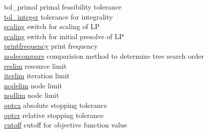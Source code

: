 \begin{tabbing}
{tol\_primal} \> primal feasibility tolerance \\
\hyperlink{tol_integer}
{tol\_integer} \> tolerance for integrality \\
\hyperlink{scaling}
{scaling} \> switch for scaling of LP \\
\hyperlink{presolve}
{scaling} \> switch for initial presolve of LP \\
\hyperlink{printfrequency}
{printfrequency} \> print frequency \\
\hyperlink{nodecompare}
{nodecompare} \> comparision method to determine tree search order \\
\hyperlink{reslim}
{reslim} \> resource limit \\
\hyperlink{iterlim}
{iterlim} \> iteration limit \\
\hyperlink{nodelim}
{nodelim} \> node limit \\
\hyperlink{nodlim}
{nodlim} \> node limit \\
\hyperlink{optca}
{optca} \> absolute stopping tolerance \\
\hyperlink{optcr}
{optcr} \> relative stopping tolerance \\
\hyperlink{cutoff}
{cutoff} \> cutoff for objective function value \\
\end{tabbing}

